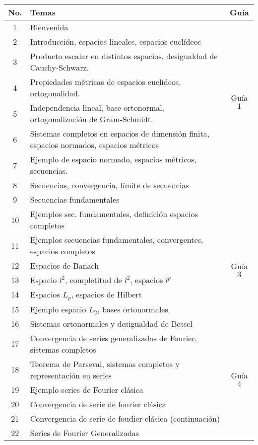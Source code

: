 \vspace{1cm}


\begin{table}[H]
	\centering
	\begin{tabular}{||c|p{13cm}||c||}
		\hline
		\hline
			No. & Temas & Guía \\
		\hline
		\hline
			1  & Bienvenida &  \\
		\hline
			2  & Introducción, espacios lineales, espacios euclídeos &  \\
			3  & Producto escalar en distintos espacios, desigualdad de Cauchy-Schwarz. & \multirow{4}{2cm}{Guía $1$} \\
			4  & Propiedades métricas de espacios euclídeos, ortogonalidad.  &  \\
			5  & Independencia lineal, base ortonormal,  ortogonalización de Gram-Schmidt. &  \\
		\hline
			6  & Sistemas completos en espacios de dimensión finita, espacios normados, espacios métricos & \multirow{4}{2cm}{Guía $2$} \\
			7  & Ejemplo de espacio normado, espacios métricos, secuencias. &  \\
			8  & Secuencias, convergencia, límite de secuencias &  \\
			9  & Secuencias fundamentales &  \\
		\hline
			10 & Ejemplos sec. fundamentales, definición espacios completos & \multirow{7}{2cm}{Guía $3$} \\
			11 & Ejemplos secuencias fundamentales, convergentes, espacios completos &  \\
			12 & Espacios de Banach &  \\
			13 & Espacio $l^2$, completitud de $l^2$, espacios $l^p$ &  \\
			14 & Espacios $L_p$, espacios de Hilbert &  \\
			15 & Ejemplo espacio $L_2$, bases ortonormales &  \\
			16 & Sistemas ortonormales y desigualdad de Bessel &  \\
		\hline
			17 & Convergencia de series generalizadas de Fourier, sistemas completos & \multirow{5}{2cm}{Guía $4$} \\
			18 & Teorema de Parseval, sistemas completos y representación en series & \\
			19 & Ejemplo series de Fourier clásica & \\
			20 & Convergencia de serie de fourier clásica & \\
			21 & Convergencia de serie de foudier clásica (continuación) & \\
		\hline
			22 & Series de Fourier Generalizadas & \\
		\hline
		\hline
	\end{tabular}
\end{table}










